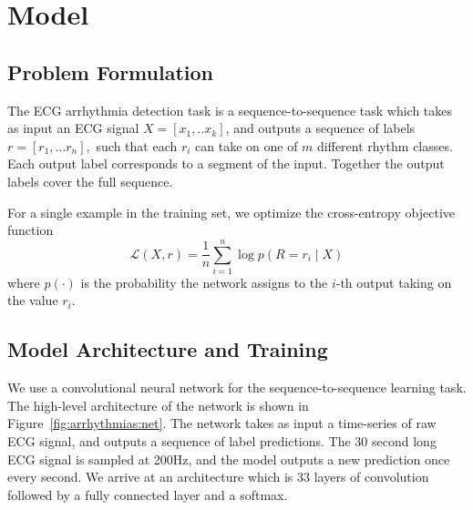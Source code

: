 \section{Model}
\label{sec:arrhythmias:model}

\subsection*{Problem Formulation}
The ECG arrhythmia detection task is a sequence-to-sequence task which takes as
input an ECG signal $X=[x_1,.. x_k]$, and outputs a sequence of labels $r=[r_1,
... r_n],$ such that each $r_i$ can take on one of $m$ different rhythm
classes. Each output label corresponds to a segment of the input. Together the
output labels cover the full sequence.

For a single example in the training set, we optimize the cross-entropy
objective function
\[
 \mathcal{L}(X, r) = \frac{1}{n} \sum_{i=1}^n \log p(R = r_i \mid X)
\]
where $p(\cdot)$ is the probability the network assigns to the $i$-th output
taking on the value $r_i$.

\subsection*{Model Architecture and Training}
We use a convolutional neural network for the sequence-to-sequence learning
task. The high-level architecture of the network is shown in
Figure~\ref{fig:arrhythmias:net}. The network takes as input a time-series of
raw ECG signal, and outputs a sequence of label predictions. The 30 second long
ECG signal is sampled at 200Hz, and the model outputs a new prediction once
every second. We arrive at an architecture which is 33 layers of convolution
followed by a fully connected layer and a softmax. 

